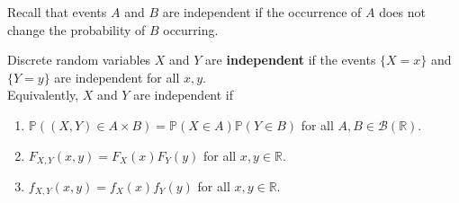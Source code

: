 \documentclass{huhtakm-template-book}
\newcommand{\prob}{\mathbb{P}}
\begin{document}
    Recall that events $A$ and $B$ are independent if the occurrence of $A$ does not change the probability of $B$ occurring.
    \begin{defn}
        Discrete random variables $X$ and $Y$ are \textbf{independent} if the events $\{X=x\}$ and $\{Y=y\}$ are independent for all $x,y$.\\
        Equivalently, $X$ and $Y$ are independent if
        \begin{enumerate}
            \item $\prob((X,Y)\in A\times B)=\prob(X\in A)\prob(Y\in B)$ for all $A,B\in\mathcal{B}(\mathbb{R})$.
            \item $F_{X,Y}(x,y)=F_{X}(x)F_{Y}(y)$ for all $x,y\in\mathbb{R}$.
            \item $f_{X,Y}(x,y)=f_{X}(x)f_{Y}(y)$ for all $x,y\in\mathbb{R}$.
        \end{enumerate}
    \end{defn}
\end{document}
